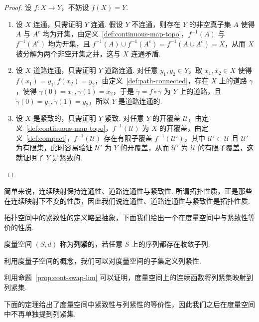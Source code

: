 \documentclass[../main.tex]{subfiles}
\begin{document}
\begin{proof}
    设 $f:X \to Y$，不妨设 $f(X) = Y$. 
    \begin{enumerate}[label = (\alph*)]
        \item 设 $X$ 连通，只需证明 $Y$ 连通. 假设 $Y$ 不连通，则存在 $Y$ 的非空真子集 $A$ 使得 $A$ 与 $A^c$ 均为开集，由定义~\ref{def:continuous-map-topo}，$f^{-1}(A)$ 与 $f^{-1}(A^c)$ 均为开集，且 $f^{-1}(A) \cup f^{-1}(A^c) = f^{-1}(A \cup A^c) = X$，从而 $X$ 被分解为两个非空开集之并，这与 $X$ 连通矛盾. 

        \item 设 $X$ 道路连通，只需证明 $Y$ 道路连通. 对任意 $y_1, y_2 \in Y$，取 $x_1, x_2 \in X$ 使得 $f(x_1) = y_1, f(x_2) = y_2$，由定义~\ref{def:path-connected}，存在 $X$ 上的道路 $\gamma$，使得 $\gamma(0) = x_1, \gamma(1) = x_2$，于是 $\widetilde{\gamma} = f \circ \gamma$ 为 $Y$ 上的道路，且 $\widetilde{\gamma}(0) = y_1, \widetilde{\gamma}(1) = y_2$，所以 $Y$ 是道路连通的. 

        \item 设 $X$ 是紧致的，只需证明 $Y$ 紧致. 对任意 $Y$ 的开覆盖 $\mathcal{U}$，由定义~\ref{def:continuous-map-topo}，$f^{-1}(\mathcal{U})$ 为 $X$ 的开覆盖，由定义~\ref{def:compact}，$f^{-1}(\mathcal{U})$ 存在有限子覆盖 $f^{-1}(\mathcal{U}')$，其中 $\mathcal{U}' \subset \mathcal{U}$ 且 $\mathcal{U}'$ 为有限集，此时容易验证 $\mathcal{U}'$ 为 $Y$ 的开覆盖，从而 $\mathcal{U}'$ 为 $\mathcal{U}$ 的有限子覆盖，这就证明了 $Y$ 是紧致的. \qedhere
    \end{enumerate}
\end{proof}

简单来说，连续映射保持连通性、道路连通性与紧致性. 所谓拓扑性质，正是那些在连续映射下不变的性质，因此我们说连通性、道路连通性与紧致性是拓扑性质. 

拓扑空间中的紧致性的定义略显抽象，下面我们给出一个在度量空间中与紧致性等价的性质. 

\begin{definition}[度量空间的列紧性的定义]
    度量空间 $(S, d)$ 称为\textbf{列紧}的，若任意 $S$ 上的序列都存在收敛子列. 
\end{definition}

\begin{remark}
    利用度量子空间的概念，我们可以对度量空间的子集定义列紧性. 
\end{remark}

利用命题~\ref{prop:cont-swap-lim} 可以证明，度量空间上的连续函数将列紧集映射到列紧集. 

下面的定理给出了度量空间中紧致性与列紧性的等价性，因此我们之后在度量空间中不再单独提到列紧集. 
\end{document}
